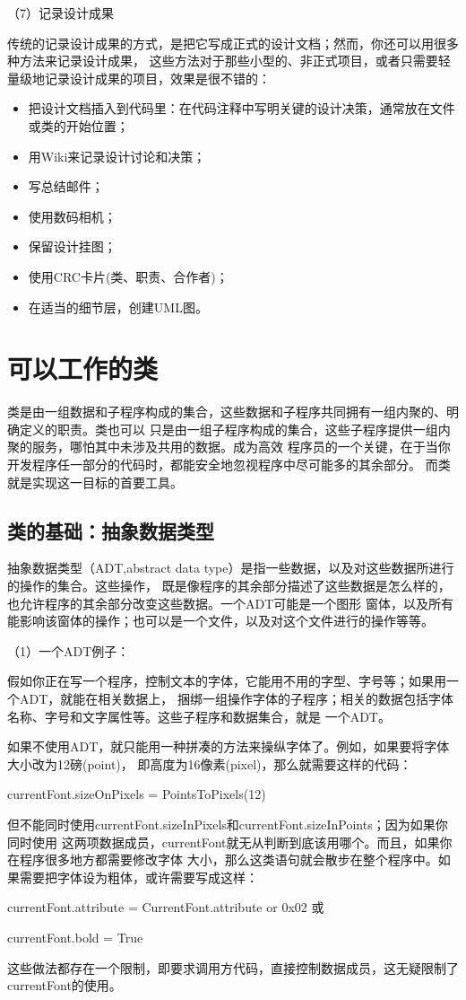 \documentclass{article}
\begin{document}
\par
（7）记录设计成果
\par
传统的记录设计成果的方式，是把它写成正式的设计文档；然而，你还可以用很多种方法来记录设计成果，
这些方法对于那些小型的、非正式项目，或者只需要轻量级地记录设计成果的项目，效果是很不错的：
\begin{itemize}
    \item 把设计文档插入到代码里：在代码注释中写明关键的设计决策，通常放在文件或类的开始位置；
    \item 用Wiki来记录设计讨论和决策；
    \item 写总结邮件；
    \item 使用数码相机；
    \item 保留设计挂图；
    \item 使用CRC卡片(类、职责、合作者)；
    \item 在适当的细节层，创建UML图。
\end{itemize}


\section{可以工作的类}
类是由一组数据和子程序构成的集合，这些数据和子程序共同拥有一组内聚的、明确定义的职责。类也可以
只是由一组子程序构成的集合，这些子程序提供一组内聚的服务，哪怕其中未涉及共用的数据。成为高效
程序员的一个关键，在于当你开发程序任一部分的代码时，都能安全地忽视程序中尽可能多的其余部分。
而类就是实现这一目标的首要工具。

\subsection{类的基础：抽象数据类型}
抽象数据类型（ADT,abstract data type）是指一些数据，以及对这些数据所进行的操作的集合。这些操作，
既是像程序的其余部分描述了这些数据是怎么样的，也允许程序的其余部分改变这些数据。一个ADT可能是一个图形
窗体，以及所有能影响该窗体的操作；也可以是一个文件，以及对这个文件进行的操作等等。
\par
（1）一个ADT例子：
\par
假如你正在写一个程序，控制文本的字体，它能用不用的字型、字号等；如果用一个ADT，就能在相关数据上，
捆绑一组操作字体的子程序；相关的数据包括字体名称、字号和文字属性等。这些子程序和数据集合，就是
一个ADT。
\par
如果不使用ADT，就只能用一种拼凑的方法来操纵字体了。例如，如果要将字体大小改为12磅(point)，
即高度为16像素(pixel)，那么就需要这样的代码：
\par
currentFont.sizeOnPixels = PointsToPixels(12)
\par
\noindent 但不能同时使用currentFont.sizeInPixels和currentFont.sizeInPoints；因为如果你同时使用
这两项数据成员，currentFont就无从判断到底该用哪个。而且，如果你在程序很多地方都需要修改字体
大小，那么这类语句就会散步在整个程序中。如果需要把字体设为粗体，或许需要写成这样：
\par
currentFont.attribute = CurrentFont.attribute or 0x02 或
\par
currentFont.bold = True
\par
\noindent 这些做法都存在一个限制，即要求调用方代码，直接控制数据成员，这无疑限制了currentFont的使用。
\end{document}
